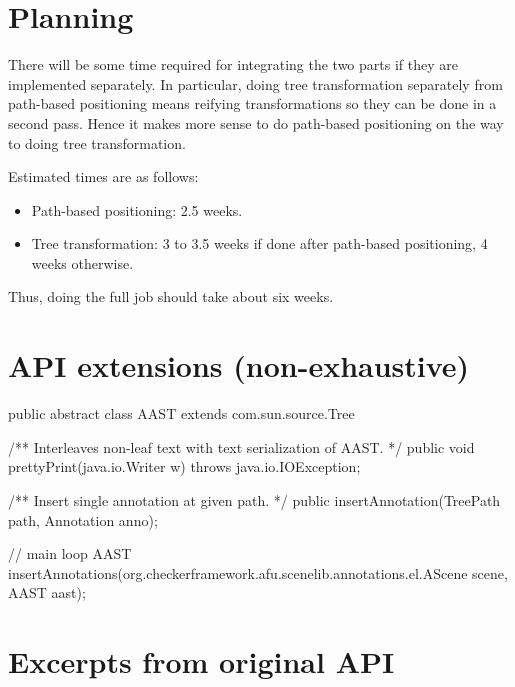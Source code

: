 \documentclass{article}
\newenvironment{jcode}{\footnotesize\verbatim}{\endverbatim\normalsize}
\begin{document}
\section{Planning}

There will be some time required for integrating the two parts if they
are implemented separately.  In particular, doing tree transformation
separately from path-based positioning means reifying transformations
so they can be done in a second pass.  Hence it makes more sense to
do path-based positioning on the way to doing tree transformation.

Estimated times are as follows:
\begin{itemize}
\item  Path-based positioning: 2.5 weeks.
\item  Tree transformation: 3 to 3.5 weeks if done after path-based
positioning, 4 weeks otherwise.
\end{itemize}
Thus, doing the full job should take about six weeks.

\appendix

\section{API extensions (non-exhaustive)}

\begin{jcode}
public abstract class AAST extends com.sun.source.Tree {
  /** Interleaves non-leaf text with text serialization of AAST. */
  public void prettyPrint(java.io.Writer w) throws java.io.IOException;

  /** Insert single annotation at given path. */
  public insertAnnotation(TreePath path, Annotation anno);
}

// main loop
AAST insertAnnotations(org.checkerframework.afu.scenelib.annotations.el.AScene scene, AAST aast);
\end{jcode}

\newpage
\section{Excerpts from original API}\label{sec:exc}
\end{document}
